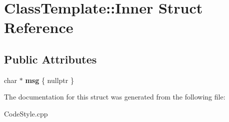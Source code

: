 \hypertarget{struct_class_template_1_1_inner}{}\section{Class\+Template\+::Inner Struct Reference}
\label{struct_class_template_1_1_inner}
\subsection*{Public Attributes}
\begin{DoxyCompactItemize}
\item 
\mbox{\label{struct_class_template_1_1_inner_a5521ddb1860648a52f50ef87bedfca8f}} 
char $\ast$ {\bfseries msg} \{ nullptr \}
\end{DoxyCompactItemize}


The documentation for this struct was generated from the following file\+:\begin{DoxyCompactItemize}
\item 
Code\+Style.\+cpp\end{DoxyCompactItemize}
